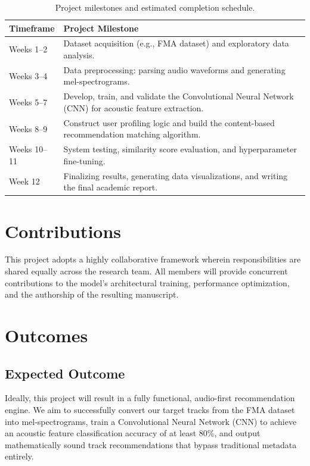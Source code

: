 \documentclass[10pt, twocolumn]{article}
\begin{document}
\begin{table}[htbp]
	\centering
	\renewcommand{\arraystretch}{1.5}
	\begin{tabular}{|p{2cm}|p{5cm}|}
		\hline
		\textbf{Timeframe} & \textbf{Project Milestone}                                                                           \\
		\hline
		Weeks 1--2         & Dataset acquisition (e.g., FMA dataset) and exploratory data analysis.                               \\
		\hline
		Weeks 3--4         & Data preprocessing: parsing audio waveforms and generating mel-spectrograms.                         \\
		\hline
		Weeks 5--7         & Develop, train, and validate the Convolutional Neural Network (CNN) for acoustic feature extraction. \\
		\hline
		Weeks 8--9         & Construct user profiling logic and build the content-based recommendation matching algorithm.        \\
		\hline
		Weeks 10--11       & System testing, similarity score evaluation, and hyperparameter fine-tuning.                         \\
		\hline
		Week 12            & Finalizing results, generating data visualizations, and writing the final academic report.           \\
		\hline
	\end{tabular}
	\caption{Project milestones and estimated completion schedule.}
	\label{tab:timeline}
\end{table}

\section{Contributions}
This project adopts a highly collaborative framework wherein responsibilities are shared equally across the research team. All members will provide concurrent contributions to the model's architectural training, performance optimization, and the authorship of the resulting manuscript.

\section{Outcomes}

\subsection*{Expected Outcome}
Ideally, this project will result in a fully functional, audio-first recommendation engine. We aim to successfully convert our target tracks from the FMA dataset into mel-spectrograms, train a Convolutional Neural Network (CNN) to achieve an acoustic feature classification accuracy of at least 80\%, and output mathematically sound track recommendations that bypass traditional metadata entirely.
\end{document}

